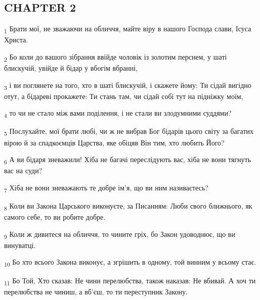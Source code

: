 \subsection{CHAPTER 2}
\begin{tcolorbox}
\textsubscript{1} Брати мої, не зважаючи на обличчя, майте віру в нашого Господа слави, Ісуса Христа.
\end{tcolorbox}
\begin{tcolorbox}
\textsubscript{2} Бо коли до вашого зібрання ввійде чоловік із золотим перснем, у шаті блискучій, увійде й бідар у вбогім вбранні,
\end{tcolorbox}
\begin{tcolorbox}
\textsubscript{3} і ви поглянете на того, хто в шаті блискучій, і скажете йому: Ти сідай вигідно отут, а бідареві прокажете: Ти стань там, чи сідай собі тут на підніжку моїм,
\end{tcolorbox}
\begin{tcolorbox}
\textsubscript{4} то чи не стало між вами поділення, і не стали ви злодумними суддями?
\end{tcolorbox}
\begin{tcolorbox}
\textsubscript{5} Послухайте, мої брати любі, чи ж не вибрав Бог бідарів цього світу за багатих вірою й за спадкоємців Царства, яке обіцяв Він тим, хто любить Його?
\end{tcolorbox}
\begin{tcolorbox}
\textsubscript{6} А ви бідаря зневажили! Хіба не багачі переслідують вас, хіба не вони тягнуть вас на суди?
\end{tcolorbox}
\begin{tcolorbox}
\textsubscript{7} Хіба не вони зневажають те добре ім'я, що ви ним називаєтесь?
\end{tcolorbox}
\begin{tcolorbox}
\textsubscript{8} Коли ви Закона Царського виконуєте, за Писанням: Люби свого ближнього, як самого себе, то ви робите добре.
\end{tcolorbox}
\begin{tcolorbox}
\textsubscript{9} Коли ж дивитеся на обличчя, то чините гріх, бо Закон удоводнює, що ви винуватці.
\end{tcolorbox}
\begin{tcolorbox}
\textsubscript{10} Бо хто всього Закона виконує, а згрішить в одному, той винним у всьому стає.
\end{tcolorbox}
\begin{tcolorbox}
\textsubscript{11} Бо Той, Хто сказав: Не чини перелюбства, також наказав: Не вбивай. А хоч ти перелюбства не чиниш, а вб'єш, то ти переступник Закону.
\end{tcolorbox}
